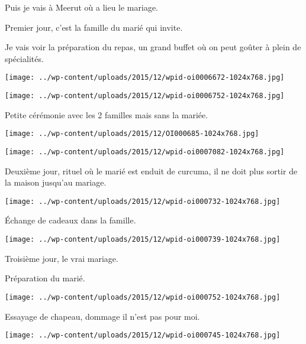 Puis je vais à Meerut où a lieu le mariage.

Premier jour, c'est la famille du marié qui invite. 

Je vais voir la préparation du repas, un grand buffet où on peut goûter à plein de spécialités. 
\begin{center} \texttt{[image: ../wp-content/uploads/2015/12/wpid-oi0006672-1024x768.jpg]} \end{center}
\begin{center} \texttt{[image: ../wp-content/uploads/2015/12/wpid-oi0006752-1024x768.jpg]} \end{center}

Petite cérémonie avec les 2 familles mais sans la mariée. 
\begin{center} \texttt{[image: ../wp-content/uploads/2015/12/OI000685-1024x768.jpg]} \end{center}
\begin{center} \texttt{[image: ../wp-content/uploads/2015/12/wpid-oi0007082-1024x768.jpg]} \end{center}

Deuxième jour, rituel où le marié est enduit de curcuma, il ne doit plus sortir de la maison jusqu'au mariage. 
\begin{center} \texttt{[image: ../wp-content/uploads/2015/12/wpid-oi000732-1024x768.jpg]} \end{center}
\vspace{-\topsep}
\pagebreak

Échange de cadeaux dans la famille. 
\begin{center} \texttt{[image: ../wp-content/uploads/2015/12/wpid-oi000739-1024x768.jpg]} \end{center}

Troisième jour, le vrai mariage.

Préparation du marié.
\begin{center} \texttt{[image: ../wp-content/uploads/2015/12/wpid-oi000752-1024x768.jpg]} \end{center}
\vspace{-\topsep}
\pagebreak

Essayage de chapeau, dommage il n'est pas pour moi. 
\begin{center} \texttt{[image: ../wp-content/uploads/2015/12/wpid-oi000745-1024x768.jpg]} \end{center}

